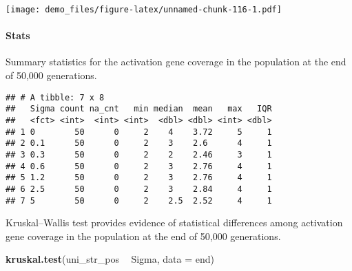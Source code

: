 \documentclass[]{book}
\newenvironment{Shaded}{\begin{snugshade}}{\end{snugshade}}
\newcommand{\DataTypeTok}[1]{\textcolor[rgb]{0.13,0.29,0.53}{#1}}
\newcommand{\KeywordTok}[1]{\textcolor[rgb]{0.13,0.29,0.53}{\textbf{#1}}}
\newcommand{\NormalTok}[1]{#1}
\newcommand{\OperatorTok}[1]{\textcolor[rgb]{0.81,0.36,0.00}{\textbf{#1}}}
\newcommand{\OtherTok}[1]{\textcolor[rgb]{0.56,0.35,0.01}{#1}}
\newcommand{\StringTok}[1]{\textcolor[rgb]{0.31,0.60,0.02}{#1}}
\let\oldparagraph\paragraph
\renewcommand{\paragraph}[1]{\oldparagraph{#1}\mbox{}}
\begin{document}
\texttt{[image: demo\_files/figure-latex/unnamed-chunk-116-1.pdf]}

\hypertarget{stats-60}{%
\paragraph{Stats}\label{stats-60}}

Summary statistics for the activation gene coverage in the population at the end of 50,000 generations.

\begin{Shaded}
\end{Shaded}

\begin{verbatim}
## # A tibble: 7 x 8
##   Sigma count na_cnt   min median  mean   max   IQR
##   <fct> <int>  <int> <int>  <dbl> <dbl> <int> <dbl>
## 1 0        50      0     2    4    3.72     5     1
## 2 0.1      50      0     2    3    2.6      4     1
## 3 0.3      50      0     2    2    2.46     3     1
## 4 0.6      50      0     2    3    2.76     4     1
## 5 1.2      50      0     2    3    2.76     4     1
## 6 2.5      50      0     2    3    2.84     4     1
## 7 5        50      0     2    2.5  2.52     4     1
\end{verbatim}

Kruskal--Wallis test provides evidence of statistical differences among activation gene coverage in the population at the end of 50,000 generations.

\begin{Shaded}
\begin{Highlighting}[]
\KeywordTok{kruskal.test}\NormalTok{(uni_str_pos }\OperatorTok{~}\StringTok{ }\NormalTok{Sigma, }\DataTypeTok{data =}\NormalTok{ end)}
\end{Highlighting}
\end{Shaded}
\end{document}
